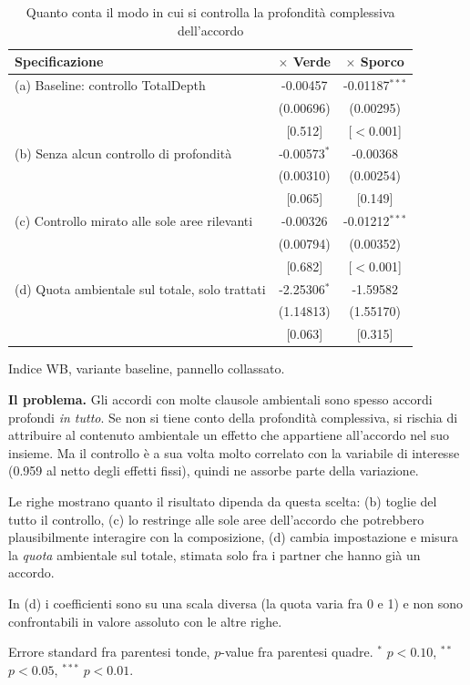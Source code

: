 \begin{table}[htbp]
\centering
\footnotesize
\caption{Quanto conta il modo in cui si controlla la profondit\`a complessiva dell'accordo}
\label{tab:depthctrl}
\begin{threeparttable}
\begin{tabular}{lcc}
\toprule
Specificazione & $\times$ Verde & $\times$ Sporco \\
\midrule
(a) Baseline: controllo TotalDepth & -0.00457 & -0.01187$^{***}$ \\
 & (0.00696) & (0.00295) \\
 & [0.512] & [$<$0.001] \\
\addlinespace
(b) Senza alcun controllo di profondit\`a & -0.00573$^{*}$ & -0.00368 \\
 & (0.00310) & (0.00254) \\
 & [0.065] & [0.149] \\
\addlinespace
(c) Controllo mirato alle sole aree rilevanti & -0.00326 & -0.01212$^{***}$ \\
 & (0.00794) & (0.00352) \\
 & [0.682] & [$<$0.001] \\
\addlinespace
(d) Quota ambientale sul totale, solo trattati & -2.25306$^{*}$ & -1.59582 \\
 & (1.14813) & (1.55170) \\
 & [0.063] & [0.315] \\
\bottomrule
\end{tabular}
\begin{tablenotes}[flushleft]\footnotesize
\item Indice WB, variante baseline, pannello collassato.
\item \textbf{Il problema.} Gli accordi con molte clausole ambientali sono spesso accordi profondi \emph{in tutto}. Se non si tiene conto della profondit\`a complessiva, si rischia di attribuire al contenuto ambientale un effetto che appartiene all'accordo nel suo insieme. Ma il controllo \`e a sua volta molto correlato con la variabile di interesse (0.959 al netto degli effetti fissi), quindi ne assorbe parte della variazione.
\item Le righe mostrano quanto il risultato dipenda da questa scelta: (b) toglie del tutto il controllo, (c) lo restringe alle sole aree dell'accordo che potrebbero plausibilmente interagire con la composizione, (d) cambia impostazione e misura la \emph{quota} ambientale sul totale, stimata solo fra i partner che hanno gi\`a un accordo.
\item In (d) i coefficienti sono su una scala diversa (la quota varia fra 0 e 1) e non sono confrontabili in valore assoluto con le altre righe.
\item Errore standard fra parentesi tonde, $p$-value fra parentesi quadre. $^{*}$ $p<0.10$, $^{**}$ $p<0.05$, $^{***}$ $p<0.01$.
\end{tablenotes}
\end{threeparttable}
\end{table}
